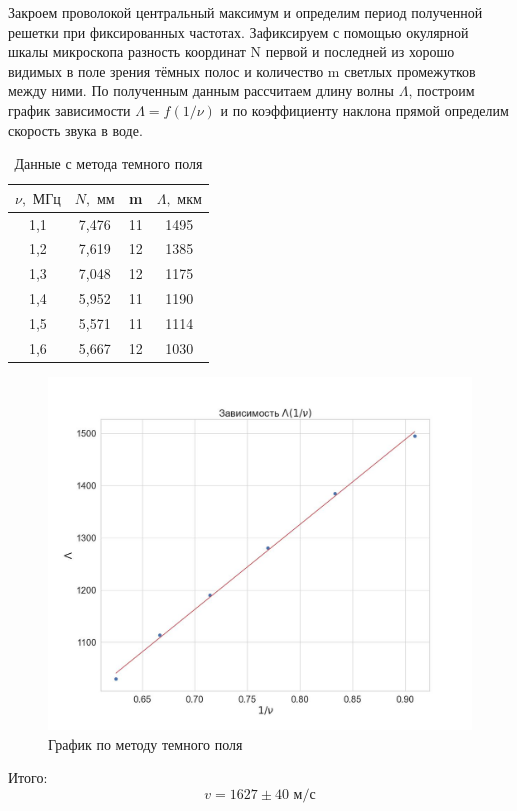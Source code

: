 \documentclass[a4paper, 12pt]{article}
\begin{document}
Закроем проволокой центральный максимум и определим период полученной решетки при фиксированных частотах. Зафиксируем с помощью окулярной шкалы микроскопа разность координат N первой и последней из хорошо видимых в поле зрения тёмных полос
и количество m светлых промежутков между ними. По полученным данным рассчитаем длину волны $\Lambda$, построим график зависимости $\Lambda = f(1/\nu)$ и по коэффициенту наклона прямой определим скорость звука в воде.
	
\begin{table}[H]
	\centering
	\begin{tabular}{|c|c|c|c|}
	\hline
	\textbf{$\nu,   \text{ МГц}$} & \textbf{$N, \text{ мм}$} & \textbf{m} & \textbf{$\Lambda, \text{ мкм}$} \\ \hline
	1,1                           & 7,476                    & 11         & 1495                           \\ \hline
	1,2                           & 7,619                    & 12         & 1385                           \\ \hline
	1,3                           & 7,048                    & 12         & 1175                           \\ \hline
	1,4                           & 5,952                    & 11         & 1190                           \\ \hline
	1,5                           & 5,571                    & 11         & 1114                           \\ \hline
	1,6                           & 5,667                    & 12         & 1030                           \\ \hline
	\end{tabular}
	\caption{Данные с метода темного поля}
	\label{tab:m}
\end{table}

\begin{figure}[H]
    \centering
    \includegraphics[width=1\textwidth]{plot1.jpg}
    \caption{График по методу темного поля}
    \label{fig:plot1}
\end{figure}
Итого:
\begin{equation*}
	v = 1627 \pm 40 \text{ м/с}
\end{equation*}
\end{document}
